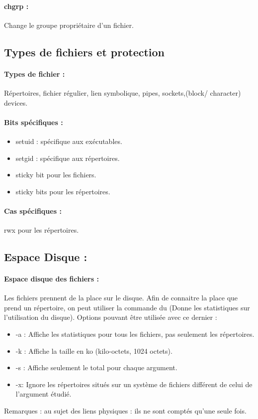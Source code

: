 \documentclass{article}[12pt]
\begin{document}
\paragraph{chgrp : }  Change le groupe propriétaire d'un fichier. 
\subsection{Types de fichiers et protection}
\paragraph{Types de fichier : } Répertoires, fichier régulier, lien symbolique, pipes, sockets,(block/ character) devices.
\paragraph{Bits spécifiques : }
\begin{itemize}
\item setuid : spécifique aux exécutables.
\item setgid : spécifique aux répertoires.
\item sticky bit pour les fichiers.
\item sticky bits pour les répertoires.
\end{itemize}
\paragraph{Cas spécifiques : } rwx pour les répertoires.
\subsection{Espace Disque : }
\paragraph{Espace disque des fichiers : } Les fichiers prennent de la place sur le disque. Afin de connaitre la place que prend un répertoire, on peut utiliser la commande du (Donne les statistiques sur l'utilisation du disque). Options pouvant être utilisée avec ce dernier :
\begin{itemize}
\item -a : Affiche les statistiques pour tous les fichiers, pas seulement les répertoires.
\item -k : Affiche la taille en ko (kilo-octets, 1024 octets).
\item -s : Affiche seulement le total pour chaque argument.
\item -x: Ignore les répertoires situés sur un système de fichiers différent de celui de l'argument étudié.
\end{itemize}
Remarques : au sujet des liens physiques : ils ne sont comptés qu'une seule fois.
\end{document}
